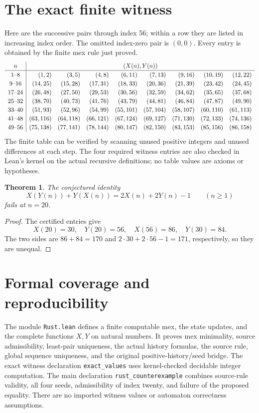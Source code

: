 \documentclass[11pt]{article}
\newtheorem{theorem}{Theorem}
\begin{document}
\section{The exact finite witness}
Here are the successive pairs through index 56; within a row they are
listed in increasing index order. The omitted index-zero pair is $(0,0)$.
Every entry is obtained by the finite mex rule just proved.
\[
\renewcommand{\arraystretch}{1.2}
\begin{array}{c|rrrrrrrr}
 n&\multicolumn{8}{c}{(X(n),Y(n))}\\\hline
1\text{--}8 & (1,2) & (3,5) & (4,8) & (6,11) & (7,13) & (9,16) & (10,19) & (12,22) \\
9\text{--}16 & (14,25) & (15,28) & (17,31) & (18,33) & (20,36) & (21,39) & (23,42) & (24,45) \\
17\text{--}24 & (26,48) & (27,50) & (29,53) & (30,56) & (32,59) & (34,62) & (35,65) & (37,68) \\
25\text{--}32 & (38,70) & (40,73) & (41,76) & (43,79) & (44,81) & (46,84) & (47,87) & (49,90) \\
33\text{--}40 & (51,93) & (52,96) & (54,99) & (55,101) & (57,104) & (58,107) & (60,110) & (61,113) \\
41\text{--}48 & (63,116) & (64,118) & (66,121) & (67,124) & (69,127) & (71,130) & (72,133) & (74,136) \\
49\text{--}56 & (75,138) & (77,141) & (78,144) & (80,147) & (82,150) & (83,153) & (85,156) & (86,158) \\
\end{array}
\]
The finite table can be verified by scanning unused positive integers and
unused differences at each step. The four required witness entries are also checked in Lean's
kernel on the actual recursive definitions; no table values are axioms or
hypotheses.

\begin{theorem}
The conjectured identity
\[
 X(Y(n))+Y(X(n))=2X(n)+2Y(n)-1\qquad(n\ge1)
\]
fails at $n=20$.
\end{theorem}
\begin{proof}
The certified entries give
\[
 X(20)=30,\quad Y(20)=56,\quad X(56)=86,\quad Y(30)=84.
\]
The two sides are $86+84=170$ and
$2\cdot30+2\cdot56-1=171$, respectively, so they are unequal.
\end{proof}

\section{Formal coverage and reproducibility}
The module \texttt{Rust.lean} defines a finite computable mex, the state
updates, and the complete functions $X,Y$ on natural numbers. It proves
mex minimality, source admissibility, least-pair uniqueness, the actual
history formulas, the source rule, global sequence uniqueness, and the
original positive-history/seed bridge. The exact witness declaration
\texttt{exact\_values} uses kernel-checked decidable integer computation.
The main declaration \texttt{rust\_counterexample} combines source-rule
validity, all four seeds, admissibility of index twenty, and failure of
the proposed equality. There are no imported witness values or automaton
correctness assumptions.
\end{document}
